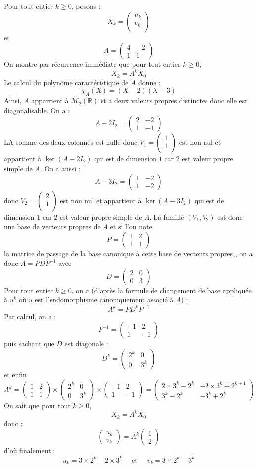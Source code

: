 \documentclass[a4paper,10pt]{report}
\newcommand{\pmatrice}[1]{\begin{pmatrix}#1\end{pmatrix}}
\begin{document}
\corr Pour tout entier $k \geq 0$, posons :
$$ X_k = \begin{pmatrix}
u_k \\
v_k \\
\end{pmatrix}$$
et
$$ A=\pmatrice{4&-2\\1&1} $$
On montre par récurrence immédiate que pour tout entier $k \geq 0$,
$$ X_k=A^k X_0$$
Le calcul du polynôme caractéristique de $A$ donne :
$$ \chi_A(X) = (X-2)(X-3)$$
Ainsi, $A$ appartient à $\mathcal{M}_2(\mathbb{R})$ et a deux valeurs propres distinctes donc elle est diagonalisable. On a :
$$ A - 2I_2 = \pmatrice{2&-2\\1&-1}$$
LA somme des deux colonnes est nulle donc $V_1=\begin{pmatrix}
1 \\
1 \\
\end{pmatrix}$
est non nul et appartient à $\ker(A-2I_2)$ qui est de dimension $1$ car $2$ est valeur propre simple de $A$. On a aussi :
$$A-3I_2=\pmatrice{1&-2\\1&-2}$$ 
donc $V_2=\begin{pmatrix}
2 \\
1 \\
\end{pmatrix}$ est non nul et appartient à $\ker(A-3I_2)$ qui est de dimension $1$ car $2$ est valeur propre simple de $A$. La famille $(V_1,V_2)$ est donc une base de vecteurs propres de $A$ et si l'on note 
$$P=\pmatrice{1&2 \\ 1&1}$$
la matrice de passage de la base canonique \`a cette base de vecteurs propres , on a donc $A=PDP^{-1}$ avec 
$$D=\pmatrice{2&0\\0&3}$$
Pour tout entier $k \geq 0$, on a (d'après la formule de changement de base appliquée à $u^k$ où $u$ est l'endomorphisme canoniquement associé à $A$) :
$$A^k=PD^kP^{-1}$$
Par calcul, on a : 
$$P^{-1}=\pmatrice{-1&2\\1&-1}$$
puis sachant que $D$ est diagonale : 
$$D^k=\pmatrice{2^k&0\\0&3^k}$$ 
et enfin 
$$A^k=\pmatrice{1&2 \\ 1&1}\times\pmatrice{2^k&0\\0&3^k}\times \pmatrice{-1&2\\1&-1} = \pmatrice{2 \times 3^k-2^k & -2 \times 3^k+2^{k+1}\\[0.15cm]3^k-2^k& -3^k+2^k}$$
On sait que pour tout $k \geq 0$,
$$X_k=A^kX_0$$
donc :
$$\pmatrice{u_k\\v_k}=A^k\pmatrice{1\\2}$$
d'o\`u finalement :
\[
u_k=3 \times 2^k-2 \times 3^k \quad \textrm{ et } \quad v_k=3 \times 2^k-3^k 
\]
\end{document}
